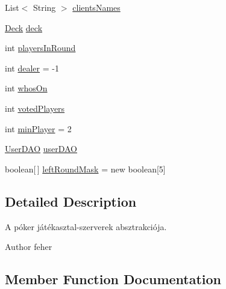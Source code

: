 \begin{DoxyCompactItemize}
\item 
List$<$ String $>$ \hyperlink{classhu_1_1elte_1_1bfw1p6_1_1poker_1_1server_1_1_abstract_poker_table_server_ac28737f9878e026f6035430b64dcb6bd}{clients\+Names}
\item 
\hyperlink{classhu_1_1elte_1_1bfw1p6_1_1poker_1_1server_1_1logic_1_1_deck}{Deck} \hyperlink{classhu_1_1elte_1_1bfw1p6_1_1poker_1_1server_1_1_abstract_poker_table_server_a8374c545d052eecec961999ebe7fb6d6}{deck}
\item 
int \hyperlink{classhu_1_1elte_1_1bfw1p6_1_1poker_1_1server_1_1_abstract_poker_table_server_aadf35496119aa1a22ba25c04c2ed0ce5}{players\+In\+Round}
\item 
int \hyperlink{classhu_1_1elte_1_1bfw1p6_1_1poker_1_1server_1_1_abstract_poker_table_server_a751c5c3e6848998d8169e705797962fc}{dealer} = -\/1
\item 
int \hyperlink{classhu_1_1elte_1_1bfw1p6_1_1poker_1_1server_1_1_abstract_poker_table_server_ac4b4b5f5ec9dfa6337b54008362895a9}{whos\+On}
\item 
int \hyperlink{classhu_1_1elte_1_1bfw1p6_1_1poker_1_1server_1_1_abstract_poker_table_server_ab4332e1c095cf889e8085e0bdac3340e}{voted\+Players}
\item 
int \hyperlink{classhu_1_1elte_1_1bfw1p6_1_1poker_1_1server_1_1_abstract_poker_table_server_a6666f184547ebf8f99bf104a79dc7c4d}{min\+Player} = 2
\item 
\hyperlink{classhu_1_1elte_1_1bfw1p6_1_1poker_1_1persist_1_1dao_1_1_user_d_a_o}{User\+D\+A\+O} \hyperlink{classhu_1_1elte_1_1bfw1p6_1_1poker_1_1server_1_1_abstract_poker_table_server_a804df37a962b13e0ad8315defb3cca3b}{user\+D\+A\+O}
\item 
boolean\mbox{[}$\,$\mbox{]} \hyperlink{classhu_1_1elte_1_1bfw1p6_1_1poker_1_1server_1_1_abstract_poker_table_server_a3f757729b56bbeba3f4f05eb98e0d202}{left\+Round\+Mask} = new boolean\mbox{[}5\mbox{]}
\end{DoxyCompactItemize}


\subsection{Detailed Description}
A póker játékasztal-\/szerverek absztrakciója. \begin{DoxyAuthor}{Author}
feher 
\end{DoxyAuthor}


\subsection{Member Function Documentation}
\hypertarget{classhu_1_1elte_1_1bfw1p6_1_1poker_1_1server_1_1_abstract_poker_table_server_a6c98a78d75e1a2d7045fab52c980acf9}{}
